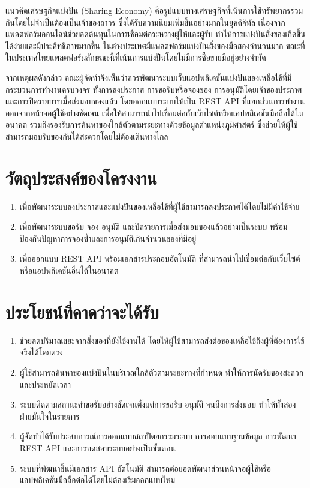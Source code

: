 \documentclass[12pt,a4paper]{report}
\begin{document}
\vspace{0.4em}

แนวคิดเศรษฐกิจแบ่งปัน (Sharing Economy) คือรูปแบบทางเศรษฐกิจที่เน้นการใช้ทรัพยากรร่วมกันโดยไม่จำเป็นต้องเป็นเจ้าของถาวร ซึ่งได้รับความนิยมเพิ่มขึ้นอย่างมากในยุคดิจิทัล เนื่องจากแพลตฟอร์มออนไลน์ช่วยลดต้นทุนในการเชื่อมต่อระหว่างผู้ให้และผู้รับ ทำให้การแบ่งปันสิ่งของเกิดขึ้นได้ง่ายและมีประสิทธิภาพมากขึ้น ในต่างประเทศมีแพลตฟอร์มแบ่งปันสิ่งของมือสองจำนวนมาก ขณะที่ในประเทศไทยแพลตฟอร์มลักษณะนี้ที่เน้นการแบ่งปันโดยไม่มีการซื้อขายมีอยู่อย่างจำกัด

\vspace{0.4em}

จากเหตุผลดังกล่าว คณะผู้จัดทำจึงเห็นว่าควรพัฒนาระบบเว็บแอปพลิเคชันแบ่งปันของเหลือใช้ที่มีกระบวนการทำงานครบวงจร ทั้งการลงประกาศ การขอรับหรือจองของ การอนุมัติโดยเจ้าของประกาศ และการปิดรายการเมื่อส่งมอบของแล้ว โดยออกแบบระบบให้เป็น REST API ที่แยกส่วนการทำงานออกจากหน้าจอผู้ใช้อย่างชัดเจน เพื่อให้สามารถนำไปเชื่อมต่อกับเว็บไซต์หรือแอปพลิเคชันมือถือได้ในอนาคต รวมถึงรองรับการค้นหาของใกล้ตัวตามระยะทางด้วยข้อมูลตำแหน่งภูมิศาสตร์ ซึ่งช่วยให้ผู้ใช้สามารถมอบรับของกันได้สะดวกโดยไม่ต้องเดินทางไกล

\section{วัตถุประสงค์ของโครงงาน}

\begin{enumerate}[label=1.2.\arabic*, leftmargin=4.2em, itemsep=0.2em]
  \item เพื่อพัฒนาระบบลงประกาศและแบ่งปันของเหลือใช้ที่ผู้ใช้สามารถลงประกาศได้โดยไม่มีค่าใช้จ่าย
  \item เพื่อพัฒนาระบบขอรับ จอง อนุมัติ และปิดรายการเมื่อส่งมอบของแล้วอย่างเป็นระบบ พร้อมป้องกันปัญหาการจองซ้ำและการอนุมัติเกินจำนวนของที่มีอยู่
  \item เพื่อออกแบบ REST API พร้อมเอกสารประกอบอัตโนมัติ ที่สามารถนำไปเชื่อมต่อกับเว็บไซต์หรือแอปพลิเคชันอื่นได้ในอนาคต
\end{enumerate}

\section{ประโยชน์ที่คาดว่าจะได้รับ}

\begin{enumerate}[label=1.3.\arabic*, leftmargin=4.2em, itemsep=0.2em]
  \item ช่วยลดปริมาณขยะจากสิ่งของที่ยังใช้งานได้ โดยให้ผู้ใช้สามารถส่งต่อของเหลือใช้ถึงผู้ที่ต้องการใช้จริงได้โดยตรง
  \item ผู้ใช้สามารถค้นหาของแบ่งปันในบริเวณใกล้ตัวตามระยะทางที่กำหนด ทำให้การนัดรับของสะดวกและประหยัดเวลา
  \item ระบบติดตามสถานะคำขอรับอย่างชัดเจนตั้งแต่การขอรับ อนุมัติ จนถึงการส่งมอบ ทำให้ทั้งสองฝ่ายมั่นใจในรายการ
  \item ผู้จัดทำได้รับประสบการณ์การออกแบบสถาปัตยกรรมระบบ การออกแบบฐานข้อมูล การพัฒนา REST API และการทดสอบระบบอย่างเป็นขั้นตอน
  \item ระบบที่พัฒนาขึ้นมีเอกสาร API อัตโนมัติ สามารถต่อยอดพัฒนาส่วนหน้าจอผู้ใช้หรือแอปพลิเคชันมือถือต่อได้โดยไม่ต้องเริ่มออกแบบใหม่
\end{enumerate}
\end{document}
